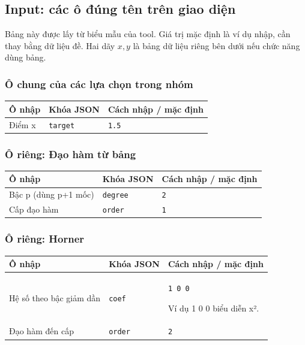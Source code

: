 \subsection*{Input: các ô đúng tên trên giao diện}
Bảng này được lấy từ biểu mẫu của tool. Giá trị mặc định là ví dụ nhập, cần thay bằng dữ liệu đề. Hai dãy $x,y$ là bảng dữ liệu riêng bên dưới nếu chức năng dùng bảng.
\subsubsection*{Ô chung của các lựa chọn trong nhóm}
\begin{center}\small\begin{tabular}{@{}p{.32\linewidth}p{.17\linewidth}p{.43\linewidth}@{}}\toprule
Ô nhập & Khóa JSON & Cách nhập / mặc định\\\midrule
Điểm x & \texttt{target} & \texttt{1.5}\\[3pt]
\bottomrule\end{tabular}\end{center}
\subsubsection*{Ô riêng: Đạo hàm từ bảng}
\begin{center}\small\begin{tabular}{@{}p{.32\linewidth}p{.17\linewidth}p{.43\linewidth}@{}}\toprule
Ô nhập & Khóa JSON & Cách nhập / mặc định\\\midrule
Bậc p (dùng p+1 mốc) & \texttt{degree} & \texttt{2}\\[3pt]
Cấp đạo hàm & \texttt{order} & \texttt{1}\\[3pt]
\bottomrule\end{tabular}\end{center}
\subsubsection*{Ô riêng: Horner}
\begin{center}\small\begin{tabular}{@{}p{.32\linewidth}p{.17\linewidth}p{.43\linewidth}@{}}\toprule
Ô nhập & Khóa JSON & Cách nhập / mặc định\\\midrule
Hệ số theo bậc giảm dần & \texttt{coef} & \texttt{1 0 0}
\par Ví dụ 1 0 0 biểu diễn x².\\[3pt]
Đạo hàm đến cấp & \texttt{order} & \texttt{2}\\[3pt]
\bottomrule\end{tabular}\end{center}
